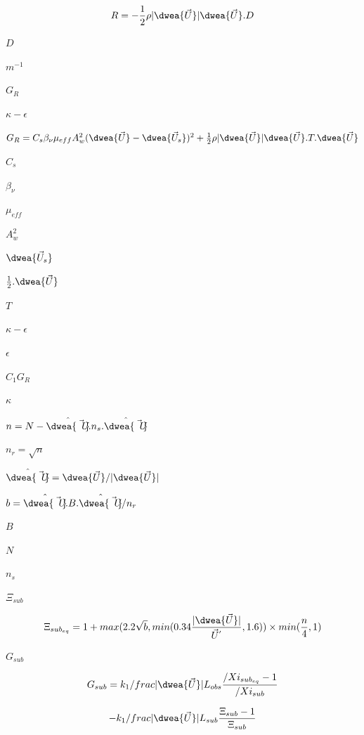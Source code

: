 \documentclass{article}
\begin{document}
\[
    R = -\frac{1}{2} \rho \vert \dwea{\vec{U}} \vert \dwea{\vec{U}}.D
\]
\pagebreak

$ D $
\pagebreak

$ m^{-1} $
\pagebreak

$ G_{R} $
\pagebreak

$ \kappa-\epsilon $
\pagebreak

$ G_{R} = C_{s}\beta_{\nu}
\mu_{eff} A_{w}^{2}(\dwea{\vec{U}}-\dwea{\vec{U}_{s}})^2 + \frac{1}{2}
\rho \vert \dwea{\vec{U}} \vert \dwea{\vec{U}}.T.\dwea{\vec{U}} $
\pagebreak

$ C_{s} $
\pagebreak

$ \beta_{\nu} $
\pagebreak

$ \mu_{eff} $
\pagebreak

$ A_{w}^{2}$
\pagebreak

$ \dwea{\vec{U}_{s}} $
\pagebreak

$ \frac{1}{2}. \dwea{\vec{U}} $
\pagebreak

$ T $
\pagebreak

$ \kappa-\epsilon
$
\pagebreak

$ \epsilon  $
\pagebreak

$ C_{1} G_{R} $
\pagebreak

$ \kappa $
\pagebreak

$ n = N - \hat{\dwea{\vec{U}}}.n_{s}.\hat{\dwea{\vec{U}}} $
\pagebreak

$ n_{r} = \sqrt{n} $
\pagebreak

$ \hat{\dwea{\vec{U}}} = \dwea{\vec{U}} / \vert \dwea{\vec{U}}
    \vert $
\pagebreak

$ b = \hat{\dwea{\vec{U}}}.B.\hat{\dwea{\vec{U}}} / n_{r} $
\pagebreak

$ B $
\pagebreak

$ N $
\pagebreak

$  n_{s} $
\pagebreak

$ \Xi_{sub} $
\pagebreak

\[
    \Xi_{{sub}_{eq}} =
        1 + max(2.2 \sqrt{b}, min(0.34 \frac{\vert \dwea{\vec{U}}
        \vert}{{\vec{U}}^{'}}, 1.6)) \times min(\frac{n}{4}, 1)
\]
\pagebreak

$ G_{sub} $
\pagebreak

\[
    G_{sub} = k_{1} /frac{\vert \dwea{\vec{U}} \vert}{L_{obs}}
             \frac{/Xi_{{sub}_{eq}}-1}{/Xi_{sub}}
\]
\pagebreak

\[
    - k_{1} /frac{\vert \dwea{\vec{U}} \vert}{L_{sub}}
    \frac{\Xi_{sub}-1}{\Xi_{sub}}
\]
\pagebreak
\end{document}
